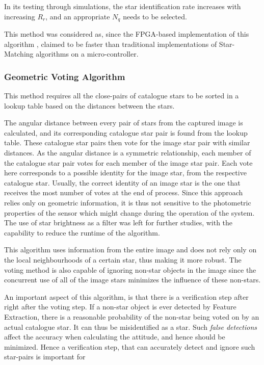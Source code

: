 \documentclass[../../main.tex]{subfiles}
\begin{document}
In its testing through simulations, the star identification rate increases with increasing $R_r$, and an appropriate $N_q$ needs to be selected.

This method was considered as, since the FPGA-based implementation of this algorithm \cite{zhao2017real}, claimed to be faster than traditional implementations of Star-Matching algorithms on a micro-controller.


\subsubsection{Geometric Voting Algorithm}
This method \cite{kolomenkin2008geometric} requires all the close-pairs of catalogue stars to be sorted in a lookup table based on the distances between the stars.

The angular distance between every pair of stars from the captured image is calculated, and its corresponding catalogue star pair is found from the lookup table. These catalogue star pairs then vote for the image star pair with similar distances. As the angular distance is a symmetric relationship, each member of the catalogue star pair votes for each member of the image star pair. 
Each vote here corresponds to a possible identity for the image star, from the respective catalogue star. Usually, the correct identity of an image star is the one that receives the most number of votes at the end of process. Since this approach relies only on geometric information, it is thus not sensitive to the photometric properties of the sensor which might change during the operation of the system.
The use of star brightness as a filter was left for further studies, with the capability to reduce the runtime of the algorithm.

This algorithm uses information from the entire image and does not rely only on the local neighbourhoods of a certain star, thus making it more robust. The voting method is also capable of ignoring non-star objects in the image since the concurrent use of all of the image stars minimizes the influence of these non-stars.


An important aspect of this algorithm, is that there is a verification step after right after the voting step. 
If a non-star object is ever detected by Feature Extraction, there is a reasonable probability of the non-star being voted on by an actual catalogue star. It can thus be misidentified as a star. Such \textit{false detections} affect the accuracy when calculating the attitude, and hence should be minimized. Hence a verification step, that can accurately detect and ignore such star-pairs is important for 
\end{document}
